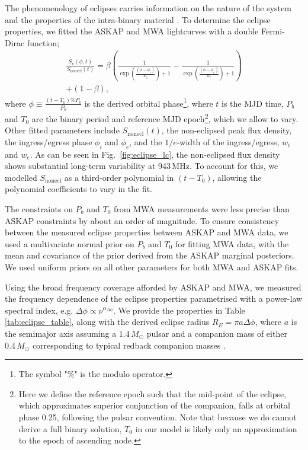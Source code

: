 \documentclass[fleqn,usenatbib]{mnras}
\begin{document}
The phenomenology of eclipses carries information on the nature of the system and the properties of the intra-binary material \citep{2020MNRAS.494.2948P}. To determine the eclipse properties, we fitted the ASKAP and MWA lightcurves with a double Fermi-Dirac function;
\begin{equation}
\label{eq:fermidirac}
\begin{split}
    \frac{S_\nu (\phi,t)}{S_{\text{nonecl}}(t)} =   \beta \left( \frac{1}{\exp\left({\frac{(\phi - \phi_i)}{w_i}}\right) + 1} - \frac{1}{\exp\left({\frac{(\phi - \phi_e)}{w_e}}\right) + 1}\right)  \\ 
    + (1 - \beta),
    \end{split}
\end{equation}
where $\phi \equiv \frac{(t - T_0)\%  P_b }{P_b}$ is the derived orbital phase\footnote{The symbol "$\%$" is the modulo operator.}, where $t$ is the MJD time, $P_b$ and $T_0$ are the binary period and reference MJD epoch\footnote{Here we define the reference epoch such that the mid-point of the eclipse, which approximates superior conjunction of the companion, falls at orbital phase 0.25, following the pulsar convention. Note that because we do cannot derive a full binary solution, $T_0$ in our model is likely only an approximation to the epoch of ascending node.}, which we allow to vary. Other fitted parameters include $S_\mathrm{nonecl}(t)$, the non-eclipsed peak flux density, the ingress/egress phase $\phi_i$ and $\phi_e$, and the $1/e$-width of the ingress/egress, $w_i$ and $w_e$. As can be seen in Fig.~\ref{fig:eclipse_lc}, the non-eclipsed flux density shows substantial long-term variability at 943\,MHz. To account for this, we modelled $S_\mathrm{nonecl}$ as a third-order polynomial in $(t-T_0)$, allowing the polynomial coefficients to vary in the fit.

The constraints on $P_b$ and $T_0$ from MWA measurements were less precise than ASKAP constraints by about an order of magnitude. To ensure consistency between the measured eclipse properties between ASKAP and MWA data, we used a multivariate normal prior on $P_b$ and $T_0$ for fitting MWA data, with the mean and covariance of the prior derived from the ASKAP marginal posteriors. We used uniform priors on all other parameters for both MWA and ASKAP fits.%

Using the broad frequency coverage afforded by ASKAP and MWA, we measured the frequency dependence of the eclipse properties parametrised with a power-law spectral index, e.g. $\Delta \phi \propto \nu^{\alpha_{\Delta \phi}}$. 
We provide the properties in Table \ref{tab:eclipse_table}, along with the derived eclipse radius $R_E = \pi a \Delta \phi$, where $a$ is the semimajor axis assuming a $1.4\,M_\odot$ pulsar and a companion mass of either $0.4\,M_\odot$ corresponding to typical redback companion masses \citep{2019ApJ...872...42S}.%
\end{document}
